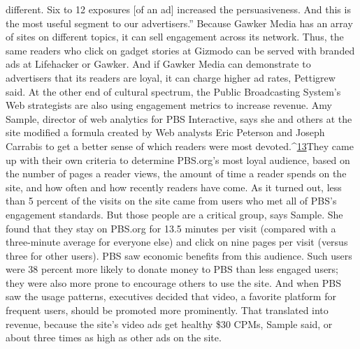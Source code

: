 different. Six to 12 exposures [of an ad] increased the persuasiveness. And this is
the most useful segment to our advertisers.''
Because Gawker Media has an array of sites on different topics, it can sell engagement
across its network. Thus, the same readers who click on gadget stories
at Gizmodo can be served with branded ads at Lifehacker or Gawker. And if
Gawker Media can demonstrate to advertisers that its readers are loyal, it can
charge higher ad rates, Pettigrew said.
At the other end of cultural spectrum, the Public Broadcasting System's Web
strategists are also using engagement metrics to increase revenue.
Amy Sample, director of web analytics for PBS Interactive, says she and others
at the site modified a formula created by Web analysts Eric Peterson and Joseph
Carrabis to get a better sense of which readers were most devoted.^{\href{#endnotes-chapter-2}{13}}They came
up with their own criteria to determine PBS.org's most loyal audience, based on
the number of pages a reader views, the amount of time a reader spends on the
site, and how often and how recently readers have come.
As it turned out, less than 5 percent of the visits on the site came from users
who met all of PBS's engagement standards. But those people are a critical
group, says Sample. She found that they stay on PBS.org for 13.5 minutes per
visit (compared with a three-minute average for everyone else) and click on nine
pages per visit (versus three for other users). PBS saw economic benefits from
this audience. Such users were 38 percent more likely to donate money to PBS
than less engaged users; they were also more prone to encourage others to use
the site. And when PBS saw the usage patterns, executives decided that video,
a favorite platform for frequent users, should be promoted more prominently.
That translated into revenue, because the site's video ads get healthy \$30 CPMs,
Sample said, or about three times as high as other ads on the site.

